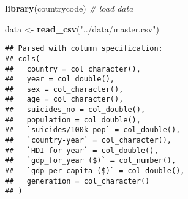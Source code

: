 \documentclass[]{article}
\newenvironment{Shaded}{\begin{snugshade}}{\end{snugshade}}
\newcommand{\CommentTok}[1]{\textcolor[rgb]{0.56,0.35,0.01}{\textit{#1}}}
\newcommand{\KeywordTok}[1]{\textcolor[rgb]{0.13,0.29,0.53}{\textbf{#1}}}
\newcommand{\NormalTok}[1]{#1}
\newcommand{\StringTok}[1]{\textcolor[rgb]{0.31,0.60,0.02}{#1}}
\begin{document}
\begin{Shaded}
\begin{Highlighting}[]
\KeywordTok{library}\NormalTok{(countrycode)}
\CommentTok{# load data}

\NormalTok{data <-}\StringTok{ }\KeywordTok{read_csv}\NormalTok{(}\StringTok{"../data/master.csv"}\NormalTok{)}
\end{Highlighting}
\end{Shaded}

\begin{verbatim}
## Parsed with column specification:
## cols(
##   country = col_character(),
##   year = col_double(),
##   sex = col_character(),
##   age = col_character(),
##   suicides_no = col_double(),
##   population = col_double(),
##   `suicides/100k pop` = col_double(),
##   `country-year` = col_character(),
##   `HDI for year` = col_double(),
##   `gdp_for_year ($)` = col_number(),
##   `gdp_per_capita ($)` = col_double(),
##   generation = col_character()
## )
\end{verbatim}
\end{document}
